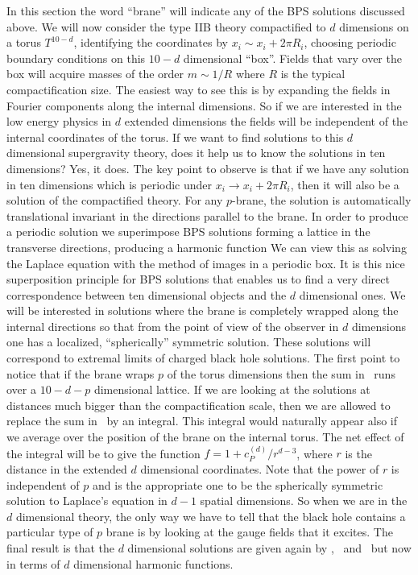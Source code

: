 In this section the word ``brane'' will indicate 
any of the BPS solutions discussed above.
We will now consider the type IIB theory  compactified 
to $d$ dimensions on a torus $T^{10 -d}$, identifying
the coordinates by $ x_i \sim x_i + 2 \pi R_i $, choosing
periodic boundary conditions on this $ 10-d $ dimensional ``box''.
Fields that vary over the box will acquire masses of the 
order $m \sim 1/R $ where $R$ is the typical compactification
size. The easiest way
to see this is by expanding the fields in Fourier components
along the internal dimensions. So 
if we are interested in the low energy physics in 
$d$ extended dimensions  the fields will be independent
of the internal coordinates of the torus. 
If  we want to find solutions to this
$d$ dimensional supergravity theory, does it
help us to know the solutions in ten dimensions?
Yes, it does. The key point to observe is that if
we have any solution in ten dimensions which is 
periodic under $ x_i \rightarrow x_i + 2 \pi R_i $, then
it will also be  a solution of the compactified 
theory. For any $p$-brane, the solution is automatically 
translational invariant in the directions parallel to
the brane. In order to produce a periodic solution we 
superimpose BPS solutions forming a lattice 
in the transverse directions, producing  a harmonic function
\eqn{}
We can view this as solving the Laplace equation with
the method of images in a periodic box. It is this nice
superposition principle for BPS solutions that enables
us to find a very direct correspondence between ten 
dimensional objects and the $d$ dimensional ones. 
We will be interested in solutions where  the 
brane is completely wrapped along the internal 
directions so that from the point of view of the
observer in  $d$ dimensions one has 
a localized, ``spherically'' symmetric solution.
These solutions will correspond to extremal limits
of charged  black hole solutions. 
The first point to notice that if the brane wraps
$p$ of the torus dimensions then the 
sum in \lattice\ runs over a $10-d-p$ dimensional lattice.
If we are looking at the solutions at distances much bigger than
the compactification scale, then we are allowed to replace
the sum in \lattice\ by an integral. This integral would naturally 
appear also if we average over the position of the
brane on the internal torus. The net effect of the 
integral will be to give the function $f = 1 + c_P^{(d)}/r^{d-3} $,
where $r$ is the distance in the extended $d$ dimensional
coordinates. Note that the power of $r$ is independent
of $p$ and is the appropriate one to be the
spherically symmetric solution to Laplace's equation
in $d-1$ spatial dimensions. 
So when we are in the $d$ dimensional theory, the only 
way we have to tell that the  black hole
contains a particular type of  $p$ brane is by looking at 
the gauge fields that it excites. The 
final result is that the $d$ dimensional solutions 
are given again 
by \fundstr , \fivebrane\ and \pbrane\ but  now in terms of 
$d$ dimensional  harmonic
functions. 

